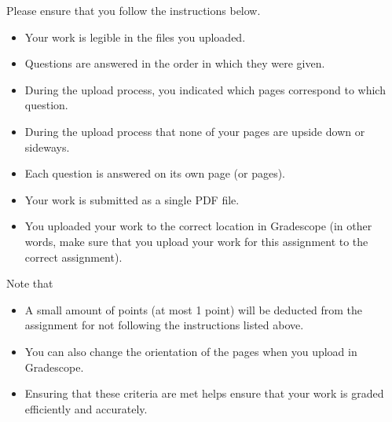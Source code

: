 \documentclass[11pt]{exam}
\begin{document}
\begin{questions}

\noindent Please ensure that you follow the instructions below. 
\begin{itemize}
    \item Your work is legible in the files you uploaded. 
    \item Questions are answered in the order in which they were given. 
    \item During the upload process, you indicated which pages correspond to which question.
    \item During the upload process that none of your pages are upside down or sideways. 
    \item Each question is answered on its own page (or pages). 
    \item Your work is submitted as a single PDF file.
    \item You uploaded your work to the correct location in Gradescope (in other words, make sure that you upload your work for this assignment to the correct assignment).
\end{itemize}
\noindent Note that
\begin{itemize}
    \item A small amount of points (at most 1 point) will be deducted from the assignment for not following the instructions listed above. 
    \item You can also change the orientation of the pages when you upload in Gradescope. 
    \item Ensuring that these criteria are met helps ensure that your work is graded efficiently and accurately. 
\end{itemize}
    
    
\end{questions}
\end{document}
